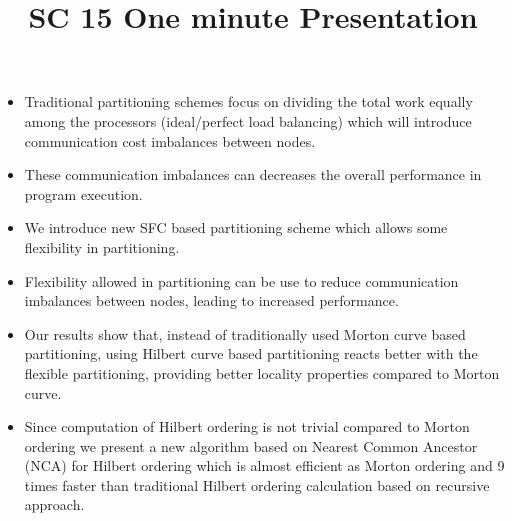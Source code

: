 \documentclass[a4paper,10pt]{article}
\title{SC 15 One minute Presentation}
\author{}
\date{}
\begin{document}
\maketitle

\begin{itemize}
 \item Traditional partitioning schemes focus on dividing the total work equally among the processors (ideal/perfect load balancing) which will introduce communication cost imbalances between nodes. 
 \item These communication imbalances can decreases the overall performance in program execution. 
 \item We introduce new SFC based partitioning scheme which allows some flexibility in partitioning. 
 \item Flexibility allowed in partitioning can be use to reduce communication imbalances between nodes, leading to increased performance.
 \item Our results show that, instead of traditionally used Morton curve based partitioning, using Hilbert curve based partitioning reacts better with the flexible partitioning, providing
 better locality properties compared to Morton curve. 
 \item Since computation of Hilbert ordering is not trivial compared to Morton ordering we present a new algorithm based on Nearest Common Ancestor (NCA) for Hilbert ordering which is almost efficient as Morton ordering and 9
 times faster than traditional Hilbert ordering calculation based on recursive approach. 
\end{itemize}
\end{document}
